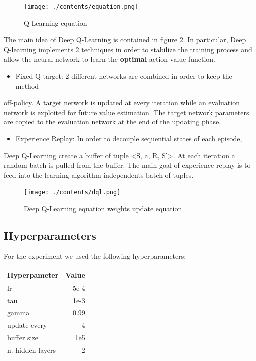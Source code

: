 \documentclass[11pt]{article}
\begin{document}
\begin{figure}[htbp]
\centering
\texttt{[image: ./contents/equation.png]}
\caption{\label{fig:org2050936}Q-Learning equation}
\end{figure}

The main idea of Deep Q-Learning is contained in figure \ref{fig:org0663b55}. In particular,
Deep Q-learning implements 2 techniques in order to stabilize the training
process and allow the neural network to learn the \textbf{optimal} action-value
function.
\begin{itemize}
\item Fixed Q-target: 2 different networks are combined in order to keep the method
\end{itemize}
off-policy. A target network is updated at every iteration while an evaluation
network is exploited for future value estimation. The target network parameters
are copied to the evaluation network at the end of the updating phase.

\begin{itemize}
\item Experience Replay: In order to decouple sequential states of each episode,
\end{itemize}
Deep Q-Learning create a buffer of tuple <S, a, R, S'>. At each iteration a
random batch is pulled from the buffer. The main goal of experience replay is to
feed into the learning algorithm independents batch of tuples.

\begin{figure}[htbp]
\centering
\texttt{[image: ./contents/dql.png]}
\caption{\label{fig:org0663b55}Deep Q-Learning equation weights update equation}
\end{figure}

\subsection{Hyperparameters}
\label{sec:orge1e8cf0}
For the experiment we used the following hyperparameters:

\begin{center}
\begin{tabular}{lr}
Hyperpameter & Value\\
\hline
lr & 5e-4\\
tau & 1e-3\\
gamma & 0.99\\
update every & 4\\
buffer size & 1e5\\
n. hidden layers & 2\\
\hline
\end{tabular}
\end{center}
\end{document}
